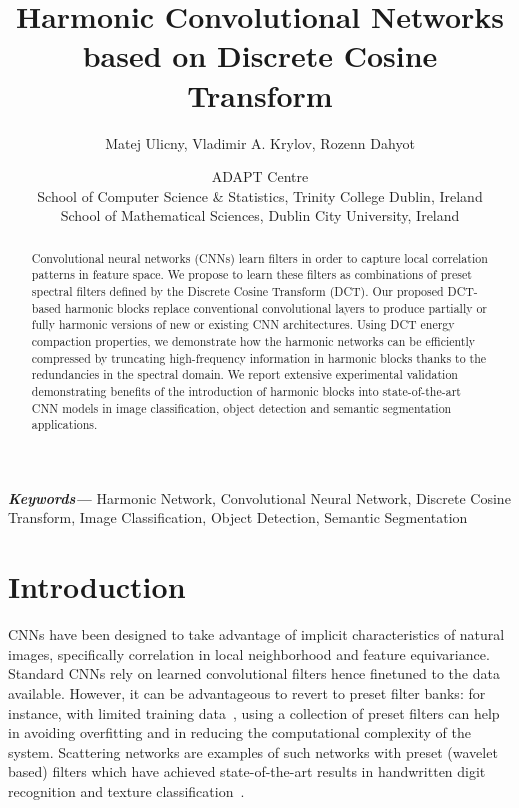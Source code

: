 \documentclass[12pt,a4paper]{article}
\providecommand{\keywords}[1]
{
  \small	
  \textbf{\textit{Keywords---}} #1
}
\begin{document}
\title{Harmonic Convolutional Networks based on Discrete Cosine Transform}

\author{Matej Ulicny, Vladimir A. Krylov, Rozenn Dahyot}
\date{ADAPT Centre\\School of Computer Science \& Statistics, Trinity College Dublin, Ireland\\School of Mathematical Sciences, Dublin City University, Ireland\\}

\maketitle

\begin{abstract}
\noindent Convolutional neural networks (CNNs) learn filters in order to capture local correlation patterns in feature space. 
We propose to learn these filters as combinations of preset spectral filters defined by the Discrete Cosine Transform (DCT).
Our proposed DCT-based harmonic blocks  replace conventional convolutional layers to produce partially or fully harmonic versions of new or existing CNN architectures. 
Using DCT energy compaction properties, we demonstrate how the harmonic networks can be efficiently compressed  by truncating high-frequency information in harmonic blocks thanks to the redundancies in the spectral domain.
We report extensive experimental validation demonstrating benefits of the introduction of harmonic blocks into state-of-the-art CNN models in image classification, object detection and semantic segmentation applications.
\end{abstract}

\keywords{
Harmonic Network, Convolutional Neural Network, Discrete Cosine Transform, Image Classification, Object Detection, Semantic Segmentation
}


\section{Introduction}\label{sec:introduction}

CNNs have been designed to take advantage of implicit characteristics of natural images, specifically correlation in local neighborhood and feature equivariance.
Standard CNNs rely on learned convolutional filters hence finetuned to the data available. However, it can be advantageous to revert to preset filter banks: for instance, with limited training data~\cite{Ulicny19}, using a  collection of preset filters can help in avoiding overfitting and in reducing the computational complexity of the system.
Scattering networks are examples of such networks with preset (wavelet based) filters  which have achieved state-of-the-art results in handwritten digit recognition and texture classification~\cite{Bruna13}.
\end{document}

